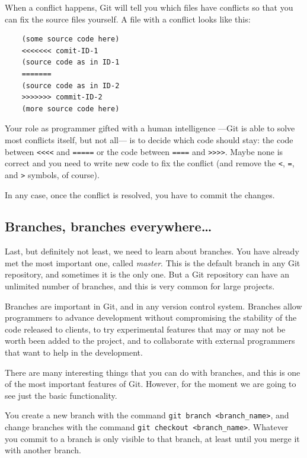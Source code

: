 When a conflict happens, Git will tell you which files have conflicts
so that you can fix the source files yourself. A file with a conflict
looks like this: 

\begin{verbatim}
    (some source code here)
    <<<<<<< comit-ID-1
    (source code as in ID-1
    =======
    (source code as in ID-2
    >>>>>>> commit-ID-2
    (more source code here)
\end{verbatim}

Your role as programmer gifted with a human intelligence ---Git is
able to solve most conflicts itself, but not all--- is to decide
which code should stay: the code between \verb+<<<<+ and \verb+=====+
or the code between \verb+====+ and \verb+>>>>+. Maybe none is
correct and you need to write new code to fix the conflict (and remove
the \verb+<+, \verb+=+, and \verb+>+ symbols, of course). 

In any case, once the conflict is resolved, you have to commit the
changes. 


\subsection{Branches, branches everywhere\ldots}
\label{sec:branch-branch-everyw}

Last, but definitely not least, we need to learn about branches. You
have already met the most important one, called \emph{master}. This is
the default branch in any Git repository, and sometimes it is the only
one. But a Git repository can have an unlimited number of branches,
and this is very common for large projects. 

Branches are important in Git, and in any version control
system. Branches allow programmers to advance development without
compromising the stability of the code released to clients, to try
experimental features that may or may not be worth been added to the
project, and to collaborate with external programmers that want to
help in the development. 

There are many interesting things that you can do with branches, and
this is one of the most important features of Git. However, for the
moment we are going to see just the basic functionality. 

You create a new branch with the command 
\verb+git branch <branch_name>+, and change branches with the command
\verb+git checkout <branch_name>+. Whatever you commit to a branch is
only visible to that branch, at least until you merge it with another
branch. 

